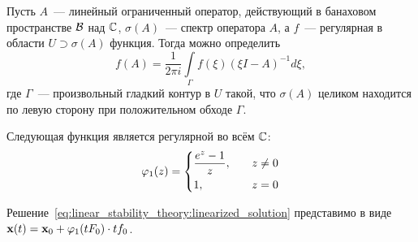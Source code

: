 \begin{definition}
    \label{definition:linear_stability_theory:regular_function_operator}
    Пусть $ A $~--- линейный ограниченный оператор, действующий в банаховом пространстве $ \mathcal{B} $ над $ \mathbb{C} $,
    $ \sigma(A) $~--- спектр оператора $ A $, а
    $ f $~--- регулярная в области $ U \supset \sigma(A) $ функция.
    Тогда можно определить
    \begin{equation}
        \label{eq:linear_stability_theory:regular_function_operator}
        f(A) = \frac{1}{2 \pi i} \int\limits_{\Gamma} f(\xi) \left( \xi I - A \right)^{-1} d \xi,
    \end{equation}
    где $ \Gamma $~--- произвольный гладкий контур в $ U $ такой,
    что $ \sigma(A) $ целиком находится по левую сторону при положительном обходе $ \Gamma $.
\end{definition}


\begin{remark}
    \label{remark:linear_stability_theory:phi_1_function}
    Следующая функция является регулярной во всём $ \mathbb{C} $:
    \begin{equation}
        \label{eq:linear_stability_theory:phi_1_function}
        \varphi_1(z) =
        \begin{dcases}
            \frac{e^z - 1}{z}, &\quad z \neq 0 \\
            1, &\quad z = 0
        \end{dcases}
    \end{equation}
\end{remark}

\begin{remark}
    \label{remark:linear_stability_theory:linearized_solution_via_phi_1}
    Решение~\eqref{eq:linear_stability_theory:linearized_solution} представимо в виде
    $ \mathbf{x}(t) = \mathbf{x}_0 + \varphi_1(t F_0) \cdot t f_0 $.
\end{remark}

